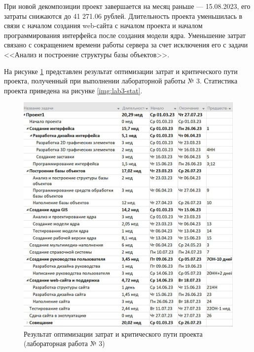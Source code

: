 При новой декомпозиции проект завершается на месяц раньше --- 15.08.2023, его затраты снижаются до 41 271.06 рублей. Длительность проекта уменьшилась в связи с началом создания web-сайта с началом проекта и началом программирования интерфейса после создания модели ядра. Уменьшение затрат связано с сокращением времени работы сервера за счет исключения его с задачи <<Анализ и построение структуры базы объектов>>.

На рисунке \ref{img:lab3} представлен результат оптимизации затрат и критического пути проекта, полученный при выполнении лабораторной работы № 3. Статистика проекта приведена на рисунке \ref{img:lab3-stat}.

\begin{figure}[H]
	\begin{center}
		\includegraphics[scale=0.3]{inc/img/lab3.jpg}
	\end{center}
	\captionsetup{justification=centering}
	\caption{Результат оптимизации затрат и критического пути проекта (лабораторная работа № 3)}
	\label{img:lab3}
\end{figure}

